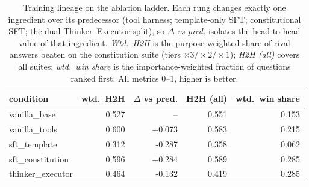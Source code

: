 \begin{table}[t]
  \centering
  \caption{Training lineage on the ablation ladder. Each rung changes exactly one ingredient over its predecessor (tool harness; template-only SFT; constitutional SFT; the dual Thinker--Executor split), so \emph{$\Delta$ vs pred.} isolates the head-to-head value of that ingredient. \emph{Wtd.\ H2H} is the purpose-weighted share of rival answers beaten on the constitution suite (tiers $\times 3/\times 2/\times 1$); \emph{H2H (all)} covers all suites; \emph{wtd.\ win share} is the importance-weighted fraction of questions ranked first. All metrics 0--1, higher is better.}
  \label{tab:rank-lineage}
  \begin{tabular}{lrrrr}
    \toprule
    condition & wtd.\ H2H & $\Delta$ vs pred. & H2H (all) & wtd.\ win share \\
    \midrule
    vanilla\_base & 0.527 & -- & 0.551 & 0.153 \\
    vanilla\_tools & 0.600 & +0.073 & 0.583 & 0.215 \\
    sft\_template & 0.312 & -0.287 & 0.358 & 0.062 \\
    sft\_constitution & 0.596 & +0.284 & 0.589 & 0.285 \\
    thinker\_executor & 0.464 & -0.132 & 0.419 & 0.285 \\
    \bottomrule
  \end{tabular}
\end{table}
